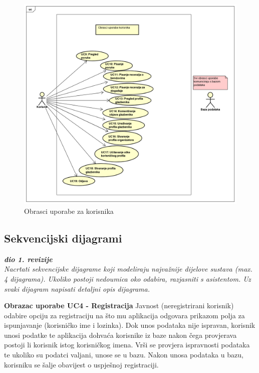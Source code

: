		\begin{figure}[H]
			\begin{center}
				\includegraphics[width=15cm]{slike/korisnik.PNG}
			\end{center}
			\caption{Obrasci uporabe za korisnika}
			\label{fig:ou3}
		\end{figure}
				
				
			\subsection{Sekvencijski dijagrami}
				
				\textbf{\textit{dio 1. revizije}}\\
				
				\textit{Nacrtati sekvencijske dijagrame koji modeliraju najvažnije dijelove sustava (max. 4 dijagrama). Ukoliko postoji nedoumica oko odabira, razjasniti s asistentom. Uz svaki dijagram napisati detaljni opis dijagrama.}
				\eject
				
				\textbf{Obrazac uporabe UC4 - Registracija}
				\newline
				Javnost (neregistrirani korisnik) odabire opciju za registraciju na što mu aplikacija odgovara prikazom polja za ispunjavanje (korisničko ime i lozinka). Dok unos podataka nije ispravan, korisnik unosi podatke te aplikacija dohvaća korisnike iz baze nakon čega provjerava postoji li korisnik istog korisničkog imena. Vrši se provjera ispravnosti podataka te ukoliko su podatci valjani, unose se u bazu. Nakon unosa podataka u bazu, korisniku se šalje obavijest o uspješnoj registraciji. 
				
